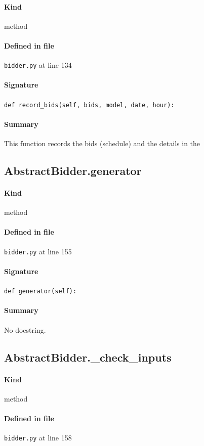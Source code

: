 \documentclass[11pt]{report}
\begin{document}
\paragraph{Kind} method
\paragraph{Defined in file} \texttt{bidder.py} at line 134
\paragraph{Signature} \texttt{def record\_bids(self, bids, model, date, hour):}
\paragraph{Summary} This function records the bids (schedule) and the details in the
\subsection{AbstractBidder.generator}
\label{def:bidder.py:AbstractBidder.generator:L155}
\paragraph{Kind} method
\paragraph{Defined in file} \texttt{bidder.py} at line 155
\paragraph{Signature} \texttt{def generator(self):}
\paragraph{Summary} No docstring.
\subsection{AbstractBidder.\_check\_inputs}
\label{def:bidder.py:AbstractBidder._check_inputs:L158}
\paragraph{Kind} method
\paragraph{Defined in file} \texttt{bidder.py} at line 158
\end{document}
